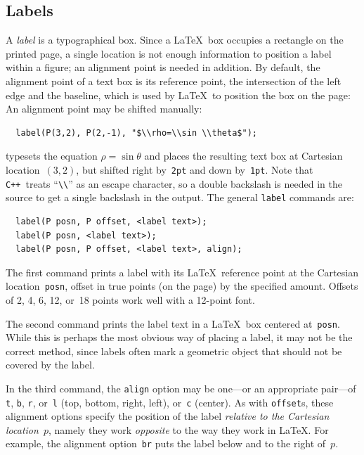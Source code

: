 \documentclass[12pt]{report}
\newcommand{\code}[1]{\texttt{#1}}
\newcommand{\CXX}{\code{C++}}
\begin{document}
\subsection*{Labels}

A \emph{label} is a typographical box. Since a \LaTeX\ box occupies a
rectangle on the printed page, a single location is not enough
information to position a label within a figure; an alignment point is
needed in addition.  By default, the alignment point of a text box is
its reference point, the intersection of the left edge and the
baseline, which is used by \LaTeX\ to position the box on the
page:
An alignment point may be shifted manually:
\begin{verbatim}
  label(P(3,2), P(2,-1), "$\\rho=\\sin \\theta$");
\end{verbatim}
typesets the equation $\rho=\sin\theta$ and places the resulting text
box at Cartesian location~$(3,2)$, but shifted right by~\code{2pt} and
down by~\code{1pt}. Note that \CXX~treats ``\verb+\\+'' as an escape
character, so a double backslash is needed in the source to get a
single backslash in the output.  The general \code{label} commands
are:
\begin{verbatim}
  label(P posn, P offset, <label text>);
  label(P posn, <label text>);
  label(P posn, P offset, <label text>, align);
\end{verbatim}
The first command prints a label with its \LaTeX\ reference point at
the Cartesian location~\code{posn}, offset in true points (on the
page) by the specified amount. Offsets of 2, 4, 6, 12, or~18 points
work well with a 12-point font.

The second command prints the label text in a \LaTeX\ box centered
at~\code{posn}. While this is perhaps the most obvious way of placing
a label, it may not be the correct method, since labels often mark a
geometric object that should not be covered by the label.

In the third command, the \code{align} option may be one---or an
appropriate pair---of \code{t}, \code{b}, \code{r}, or~\code{l} (top,
bottom, right, left), or~\code{c} (center). As with \code{offset}s,
these alignment options specify the position of the label
\emph{relative to the Cartesian location}~$p$, namely they work
\emph{opposite} to the way they work in \LaTeX. For example, the
alignment option~\code{br} puts the label below and to the right
of~$p$.
\begin{center}
  \qquad
  
\end{center}
\end{document}
